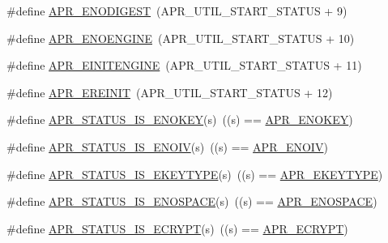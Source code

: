 \begin{DoxyCompactItemize}
\#define \hyperlink{group___a_p_r___util___error_ga93f22e73099e3cd744ea96da38602065}{A\-P\-R\-\_\-\-E\-N\-O\-D\-I\-G\-E\-S\-T}~(A\-P\-R\-\_\-\-U\-T\-I\-L\-\_\-\-S\-T\-A\-R\-T\-\_\-\-S\-T\-A\-T\-U\-S + 9)
\item 
\#define \hyperlink{group___a_p_r___util___error_gacda8be948c23dbd1347f3302fb1c577f}{A\-P\-R\-\_\-\-E\-N\-O\-E\-N\-G\-I\-N\-E}~(A\-P\-R\-\_\-\-U\-T\-I\-L\-\_\-\-S\-T\-A\-R\-T\-\_\-\-S\-T\-A\-T\-U\-S + 10)
\item 
\#define \hyperlink{group___a_p_r___util___error_ga9d8482ae4b93bdce0f31f120c0511550}{A\-P\-R\-\_\-\-E\-I\-N\-I\-T\-E\-N\-G\-I\-N\-E}~(A\-P\-R\-\_\-\-U\-T\-I\-L\-\_\-\-S\-T\-A\-R\-T\-\_\-\-S\-T\-A\-T\-U\-S + 11)
\item 
\#define \hyperlink{group___a_p_r___util___error_ga161b8a0f8e24033e8cd5d9068d524f00}{A\-P\-R\-\_\-\-E\-R\-E\-I\-N\-I\-T}~(A\-P\-R\-\_\-\-U\-T\-I\-L\-\_\-\-S\-T\-A\-R\-T\-\_\-\-S\-T\-A\-T\-U\-S + 12)
\item 
\#define \hyperlink{group___a_p_r___util___error_ga060055dd2eb82e8450015fa2fae5f87c}{A\-P\-R\-\_\-\-S\-T\-A\-T\-U\-S\-\_\-\-I\-S\-\_\-\-E\-N\-O\-K\-E\-Y}(s)~((s) == \hyperlink{group___a_p_r___util___error_gabf9bbd463ebcf38611f6acd423e49de9}{A\-P\-R\-\_\-\-E\-N\-O\-K\-E\-Y})
\item 
\#define \hyperlink{group___a_p_r___util___error_ga5d6aa91dabbbaa71f11c293af460b143}{A\-P\-R\-\_\-\-S\-T\-A\-T\-U\-S\-\_\-\-I\-S\-\_\-\-E\-N\-O\-I\-V}(s)~((s) == \hyperlink{group___a_p_r___util___error_ga2df3db3a80a6e153134caf5d3a62a00f}{A\-P\-R\-\_\-\-E\-N\-O\-I\-V})
\item 
\#define \hyperlink{group___a_p_r___util___error_ga0693be89f2dc48f2931ff4572bd5872d}{A\-P\-R\-\_\-\-S\-T\-A\-T\-U\-S\-\_\-\-I\-S\-\_\-\-E\-K\-E\-Y\-T\-Y\-P\-E}(s)~((s) == \hyperlink{group___a_p_r___util___error_ga637727cdf8285d12663ddf8bb89fa048}{A\-P\-R\-\_\-\-E\-K\-E\-Y\-T\-Y\-P\-E})
\item 
\#define \hyperlink{group___a_p_r___util___error_ga32f4e4d4cff641d33acf3cb722e36b1f}{A\-P\-R\-\_\-\-S\-T\-A\-T\-U\-S\-\_\-\-I\-S\-\_\-\-E\-N\-O\-S\-P\-A\-C\-E}(s)~((s) == \hyperlink{group___a_p_r___util___error_gaec7a912cf8fe5f964ad8fbbafaff0241}{A\-P\-R\-\_\-\-E\-N\-O\-S\-P\-A\-C\-E})
\item 
\#define \hyperlink{group___a_p_r___util___error_ga9933a7168395bc0786b3ba477566fd7b}{A\-P\-R\-\_\-\-S\-T\-A\-T\-U\-S\-\_\-\-I\-S\-\_\-\-E\-C\-R\-Y\-P\-T}(s)~((s) == \hyperlink{group___a_p_r___util___error_ga2e98ff79515dfd5a21583d09c300d9bb}{A\-P\-R\-\_\-\-E\-C\-R\-Y\-P\-T})
\item 

\end{DoxyCompactItemize}
